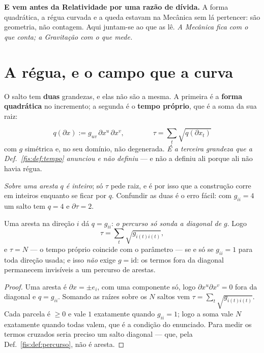 \documentclass[livro.tex]{subfiles}
\begin{document}
\medskip\noindent\textbf{E vem antes da Relatividade por uma razão de dívida.} A
forma quadrática, a régua curvada e a queda estavam na Mecânica sem lá pertencer:
são geometria, não contagem. Aqui juntam-se ao que as lê. \emph{A Mecânica fica
com o que conta; a Gravitação com o que mede.}


\section{A régua, e o campo que a curva}\label{fis:grav-regua}


\noindent O salto tem \textbf{duas} grandezas, e elas não são a mesma. A primeira
é a \textbf{forma quadrática} no incremento; a segunda é o \textbf{tempo próprio},
que é a soma da sua raiz:
\begin{definicao}\label{fis:def:intervalo}
\[
\boxed{\;q(\partial x):=g_{uv}\,\partial x^{u}\,\partial x^{v},
\qquad\qquad
\tau=\sum_{t}\sqrt{q(\partial x_t)}\;}
\]
com $g$ simétrica e, no seu domínio, não degenerada. \emph{É a terceira grandeza
que a Def.~\ref{fis:def:tempo} anunciou e não definiu} --- e não a definiu ali
porque ali não havia régua.
\end{definicao}

\noindent \emph{Sobre uma aresta $q$ é
inteiro}; só $\tau$ pede raiz, e é por isso que a construção corre em inteiros
enquanto se ficar por $q$. Confundir as duas é o erro fácil: com $g_{ii}=4$ um
salto tem $q=4$ e $\partial\tau=2$.

\begin{teorema}\label{fis:thm:gcanon}
Uma aresta na direção $i$ dá $q=g_{ii}$: \emph{o percurso só sonda a diagonal de
$g$}. Logo
\[
\tau=\sum_{t}\sqrt{g_{i(t)i(t)}} ,
\]
e $\tau=N$ --- o tempo próprio coincide com o parâmetro --- se e só se
$g_{ii}=1$ para toda direção usada; e isso \emph{não} exige $g=\mathrm{id}$: os
termos fora da diagonal permanecem invisíveis a um percurso de arestas.
\end{teorema}

\begin{proof}
Uma aresta é $\partial x=\pm e_i$, com uma componente só, logo
$\partial x^{u}\partial x^{v}=0$ fora da diagonal e $q=g_{ii}$. Somando as raízes
sobre os $N$ saltos vem $\tau=\sum_t\sqrt{g_{i(t)i(t)}}$. Cada parcela é $\ge0$ e
vale $1$ exatamente quando $g_{ii}=1$; logo a soma vale $N$ exatamente quando
todas valem, que é a condição do enunciado. Para medir os termos cruzados seria
preciso um salto diagonal --- que, pela Def.~\ref{fis:def:percurso}, não é aresta.
\end{proof}
\end{document}
